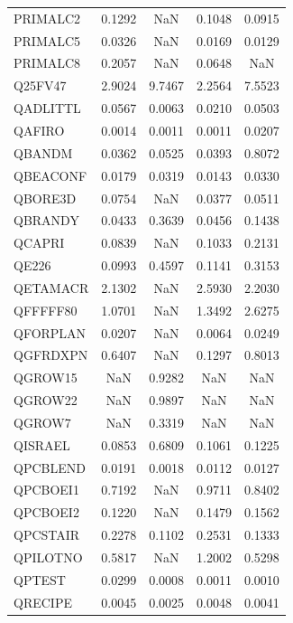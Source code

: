 \begin{longtable}{lcccc}
PRIMALC2 &   0.1292 &      NaN &     0.1048 &   0.0915 \\
PRIMALC5 &   0.0326 &      NaN &     0.0169 &   0.0129 \\
PRIMALC8 &   0.2057 &      NaN &     0.0648 &      NaN \\
Q25FV47  &   2.9024 &   9.7467 &     2.2564 &   7.5523 \\
QADLITTL &   0.0567 &   0.0063 &     0.0210 &   0.0503 \\
QAFIRO   &   0.0014 &   0.0011 &     0.0011 &   0.0207 \\
QBANDM   &   0.0362 &   0.0525 &     0.0393 &   0.8072 \\
QBEACONF &   0.0179 &   0.0319 &     0.0143 &   0.0330 \\
QBORE3D  &   0.0754 &      NaN &     0.0377 &   0.0511 \\
QBRANDY  &   0.0433 &   0.3639 &     0.0456 &   0.1438 \\
QCAPRI   &   0.0839 &      NaN &     0.1033 &   0.2131 \\
QE226    &   0.0993 &   0.4597 &     0.1141 &   0.3153 \\
QETAMACR &   2.1302 &      NaN &     2.5930 &   2.2030 \\
QFFFFF80 &   1.0701 &      NaN &     1.3492 &   2.6275 \\
QFORPLAN &   0.0207 &      NaN &     0.0064 &   0.0249 \\
QGFRDXPN &   0.6407 &      NaN &     0.1297 &   0.8013 \\
QGROW15  &      NaN &   0.9282 &        NaN &      NaN \\
QGROW22  &      NaN &   0.9897 &        NaN &      NaN \\
QGROW7   &      NaN &   0.3319 &        NaN &      NaN \\
QISRAEL  &   0.0853 &   0.6809 &     0.1061 &   0.1225 \\
QPCBLEND &   0.0191 &   0.0018 &     0.0112 &   0.0127 \\
QPCBOEI1 &   0.7192 &      NaN &     0.9711 &   0.8402 \\
QPCBOEI2 &   0.1220 &      NaN &     0.1479 &   0.1562 \\
QPCSTAIR &   0.2278 &   0.1102 &     0.2531 &   0.1333 \\
QPILOTNO &   0.5817 &      NaN &     1.2002 &   0.5298 \\
QPTEST   &   0.0299 &   0.0008 &     0.0011 &   0.0010 \\
QRECIPE  &   0.0045 &   0.0025 &     0.0048 &   0.0041 \\

\end{longtable}
